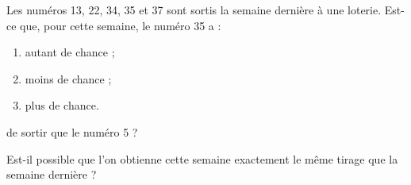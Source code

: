 
Les numéros 13, 22, 34, 35 et 37 sont sortis la semaine dernière à une loterie. Est-ce que, pour cette semaine, le numéro 35 a :
\begin{enumerate}
\item autant de chance ;
\item moins de chance ; 
\item plus de chance. 
\end{enumerate}
de sortir que le numéro 5 ?

Est-il possible que l’on obtienne cette semaine exactement le même tirage que la semaine 
dernière ?